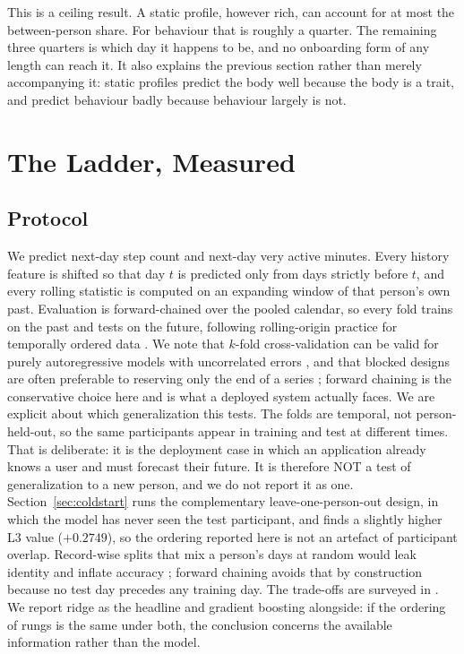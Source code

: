 \documentclass[conference]{IEEEtran}
\begin{document}
This is a ceiling result. A static profile, however rich, can account for at most the between-person share. For behaviour that is roughly a quarter. The remaining three quarters is which day it happens to be, and no onboarding form of any length can reach it. It also explains the previous section rather than merely accompanying it: static profiles predict the body well because the body is a trait, and predict behaviour badly because behaviour largely is not.

\section{The Ladder, Measured}

\subsection{Protocol}
We predict next-day step count and next-day very active minutes. Every history feature is shifted so that day $t$ is predicted only from days strictly before $t$, and every rolling statistic is computed on an expanding window of that person's own past. Evaluation is forward-chained over the pooled calendar, so every fold trains on the past and tests on the future, following rolling-origin practice for temporally ordered data \cite{tashman2000oos}. We note that $k$-fold cross-validation can be valid for purely autoregressive models with uncorrelated errors \cite{bergmeir2018arcv}, and that blocked designs are often preferable to reserving only the end of a series \cite{bergmeir2012tscv}; forward chaining is the conservative choice here and is what a deployed system actually faces. We are explicit about which generalization this tests. The folds are temporal, not person-held-out, so the same participants appear in training and test at different times. That is deliberate: it is the deployment case in which an application already knows a user and must forecast their future. It is therefore NOT a test of generalization to a new person, and we do not report it as one. Section~\ref{sec:coldstart} runs the complementary leave-one-person-out design, in which the model has never seen the test participant, and finds a slightly higher L3 value ($+0.2749$), so the ordering reported here is not an artefact of participant overlap. Record-wise splits that mix a person's days at random would leak identity and inflate accuracy \cite{saeb2017usecase, roberts2017blockcv}; forward chaining avoids that by construction because no test day precedes any training day. The trade-offs are surveyed in \cite{arlot2010cvsurvey, little2017cvperspectives}. We report ridge as the headline and gradient boosting alongside: if the ordering of rungs is the same under both, the conclusion concerns the available information rather than the model.
\end{document}
